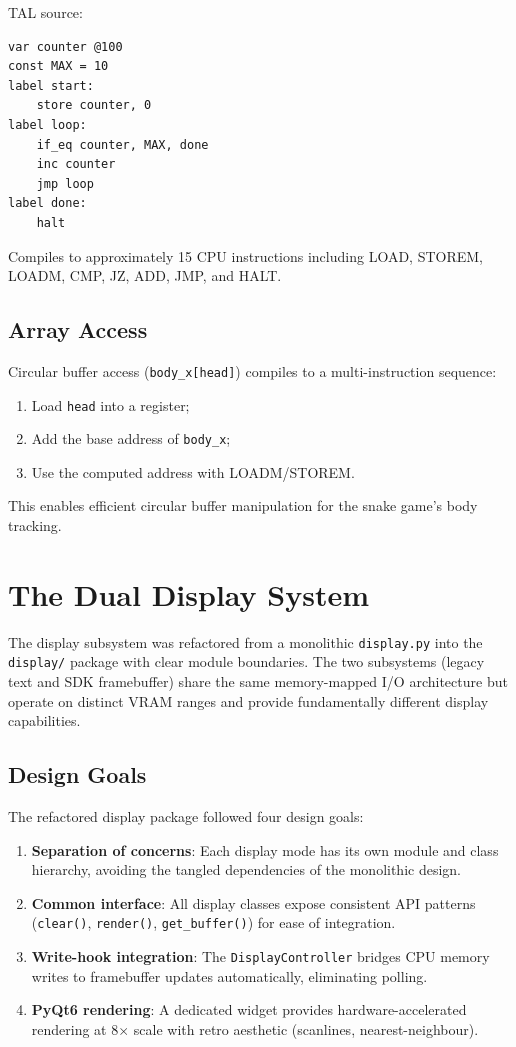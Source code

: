 \documentclass[10pt,a4paper,twoside]{book}
\begin{document}
TAL source:
\begin{verbatim}
var counter @100
const MAX = 10
label start:
    store counter, 0
label loop:
    if_eq counter, MAX, done
    inc counter
    jmp loop
label done:
    halt
\end{verbatim}

Compiles to approximately 15 CPU instructions including LOAD, STOREM, LOADM, CMP, JZ,
ADD, JMP, and HALT.

\section{Array Access}

Circular buffer access (\texttt{body\_x[head]}) compiles to a multi-instruction
sequence:
\begin{enumerate}
    \item Load \texttt{head} into a register;
    \item Add the base address of \texttt{body\_x};
    \item Use the computed address with LOADM/STOREM.
\end{enumerate}

This enables efficient circular buffer manipulation for the snake game's body tracking.

\chapter{The Dual Display System}
\label{ch:dualdisplay}

The display subsystem was refactored from a monolithic \texttt{display.py} into the
\texttt{display/} package with clear module boundaries. The two subsystems (legacy
text and SDK framebuffer) share the same memory-mapped I/O architecture but operate
on distinct VRAM ranges and provide fundamentally different display capabilities.

\section{Design Goals}

The refactored display package followed four design goals:
\begin{enumerate}
    \item \textbf{Separation of concerns}: Each display mode has its own module and
          class hierarchy, avoiding the tangled dependencies of the monolithic design.
    \item \textbf{Common interface}: All display classes expose consistent API
          patterns (\texttt{clear()}, \texttt{render()}, \texttt{get\_buffer()}) for
          ease of integration.
    \item \textbf{Write-hook integration}: The \texttt{DisplayController} bridges
          CPU memory writes to framebuffer updates automatically, eliminating polling.
    \item \textbf{PyQt6 rendering}: A dedicated widget provides hardware-accelerated
          rendering at 8$\times$ scale with retro aesthetic (scanlines, nearest-neighbour).
\end{enumerate}
\end{document}
